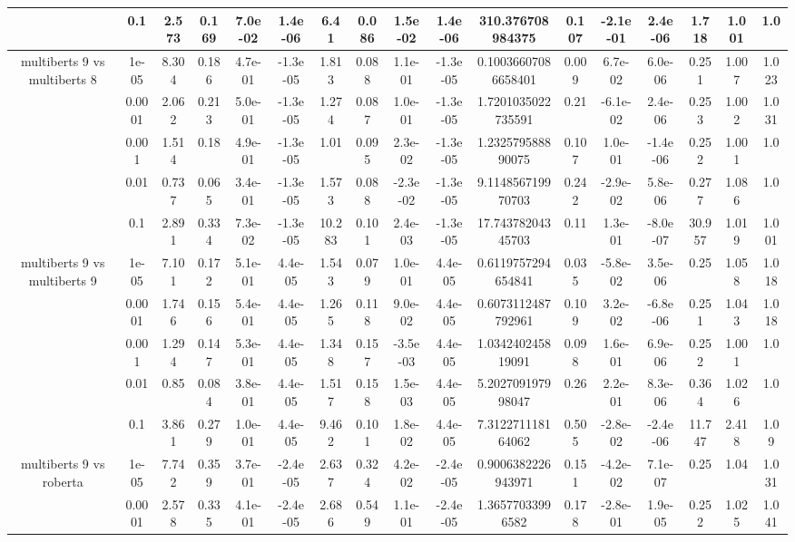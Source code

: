 \begin{tabular}{|c|c|c|c|c|c|c|c|c|c|c|c|c|c|c|c|c|}
 & 0.1 & 2.573 & 0.169 & 7.0e-02 & 1.4e-06 & 6.41 & 0.086 & 1.5e-02 & 1.4e-06 & 310.376708984375 & 0.107 & -2.1e-01 & 2.4e-06 & 1.718 & 1.001 & 1.0 \\
\hline
\multirow{5}{*}{multiberts 9 vs multiberts 8} & 1e-05 & 8.304 & 0.186 & 4.7e-01 & -1.3e-05 & 1.813 & 0.088 & 1.1e-01 & -1.3e-05 & 0.10036607086658401 & 0.009 & 6.7e-02 & 6.0e-06 & 0.251 & 1.007 & 1.023 \\
 & 0.0001 & 2.062 & 0.213 & 5.0e-01 & -1.3e-05 & 1.274 & 0.087 & 1.0e-01 & -1.3e-05 & 1.7201035022735591 & 0.21 & -6.1e-02 & 2.4e-06 & 0.253 & 1.002 & 1.031 \\
 & 0.001 & 1.514 & 0.18 & 4.9e-01 & -1.3e-05 & 1.01 & 0.095 & 2.3e-02 & -1.3e-05 & 1.232579588890075 & 0.107 & 1.0e-01 & -1.4e-06 & 0.252 & 1.001 & 1.0 \\
 & 0.01 & 0.737 & 0.065 & 3.4e-01 & -1.3e-05 & 1.573 & 0.088 & -2.3e-02 & -1.3e-05 & 9.114856719970703 & 0.242 & -2.9e-02 & 5.8e-06 & 0.277 & 1.086 & 1.0 \\
 & 0.1 & 2.891 & 0.334 & 7.3e-02 & -1.3e-05 & 10.283 & 0.101 & 2.4e-03 & -1.3e-05 & 17.74378204345703 & 0.11 & 1.3e-01 & -8.0e-07 & 30.957 & 1.019 & 1.001 \\
\hline
\multirow{5}{*}{multiberts 9 vs multiberts 9} & 1e-05 & 7.101 & 0.172 & 5.1e-01 & 4.4e-05 & 1.543 & 0.079 & 1.0e-01 & 4.4e-05 & 0.6119757294654841 & 0.035 & -5.8e-02 & 3.5e-06 & 0.25 & 1.058 & 1.018 \\
 & 0.0001 & 1.746 & 0.156 & 5.4e-01 & 4.4e-05 & 1.265 & 0.118 & 9.0e-02 & 4.4e-05 & 0.6073112487792961 & 0.109 & 3.2e-02 & -6.8e-06 & 0.251 & 1.043 & 1.018 \\
 & 0.001 & 1.294 & 0.147 & 5.3e-01 & 4.4e-05 & 1.348 & 0.157 & -3.5e-03 & 4.4e-05 & 1.034240245819091 & 0.098 & 1.6e-01 & 6.9e-06 & 0.252 & 1.001 & 1.0 \\
 & 0.01 & 0.85 & 0.084 & 3.8e-01 & 4.4e-05 & 1.517 & 0.158 & 1.5e-03 & 4.4e-05 & 5.202709197998047 & 0.26 & 2.2e-01 & 8.3e-06 & 0.364 & 1.026 & 1.0 \\
 & 0.1 & 3.861 & 0.279 & 1.0e-01 & 4.4e-05 & 9.462 & 0.101 & 1.8e-02 & 4.4e-05 & 7.312271118164062 & 0.505 & -2.8e-02 & -2.4e-06 & 11.747 & 2.418 & 1.09 \\
\hline
\multirow{5}{*}{multiberts 9 vs roberta } & 1e-05 & 7.742 & 0.359 & 3.7e-01 & -2.4e-05 & 2.637 & 0.324 & 4.2e-02 & -2.4e-05 & 0.9006382226943971 & 0.151 & -4.2e-02 & 7.1e-07 & 0.25 & 1.04 & 1.031 \\
 & 0.0001 & 2.578 & 0.335 & 4.1e-01 & -2.4e-05 & 2.686 & 0.549 & 1.1e-01 & -2.4e-05 & 1.36577033996582 & 0.178 & -2.8e-01 & 1.9e-05 & 0.252 & 1.025 & 1.041 \\

\end{tabular}
